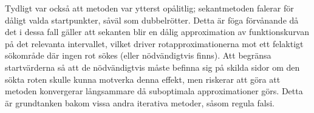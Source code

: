 \documentclass{article}
\begin{document}
Tydligt var också att metoden var ytterst opålitlig; sekantmetoden falerar för dåligt valda startpunkter, såväl som dubbelrötter. Detta är föga förvånande då det i dessa fall gäller att sekanten blir en dålig approximation av funktionskurvan på det relevanta intervallet, vilket driver rotapproximationerna mot ett felaktigt sökområde där ingen rot sökes (eller nödvändigtvis finns). Att begränsa startvärderna så att de nödvändigtvis måste befinna sig på skilda sidor om den sökta roten skulle kunna motverka denna effekt, men riskerar att göra att metoden konvergerar långsammare då suboptimala approximationer görs. Detta är grundtanken bakom vissa andra iterativa metoder, såsom regula falsi.
\end{document}
